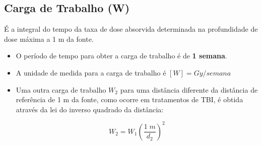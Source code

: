 \documentclass[11pt,a4paper]{article}
\begin{document}
        \subsection*{\textcolor{CarnationPink}{Carga de Trabalho (W)}}

            É a integral do tempo da taxa de dose absorvida determinada na profundidade de dose máxima a 1 m da fonte. 

            \begin{itemize}
                \item O período de tempo para obter a carga de trabalho é de \textbf{1 semana}.
                \item A unidade de medida para a carga de trabalho é $[W] = Gy/semana$
                \item Uma outra carga de trabalho $W_2$ para uma distância diferente da distância de referência de 1 m da fonte, como ocorre em tratamentos de TBI, é obtida através da lei do inverso quadrado da distância:
                
                    \begin{equation}
                        W_2 = W_1 \left(\frac{1 \; m}{d_2}\right)^2
                    \end{equation}


\end{itemize}
\end{document}

